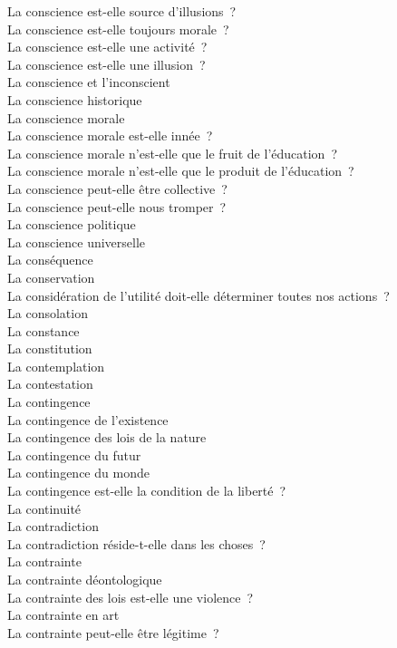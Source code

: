 \documentclass[a4paper,12pt]{article}
\begin{document}
La conscience est-elle source d'illusions ? \\
La conscience est-elle toujours morale ? \\
La conscience est-elle une activité ? \\
La conscience est-elle une illusion ? \\
La conscience et l'inconscient \\
La conscience historique \\
La conscience morale \\
La conscience morale est-elle innée ? \\
La conscience morale n'est-elle que le fruit de l'éducation ? \\
La conscience morale n'est-elle que le produit de l'éducation ? \\
La conscience peut-elle être collective ? \\
La conscience peut-elle nous tromper ? \\
La conscience politique \\
La conscience universelle \\
La conséquence \\
La conservation \\
La considération de l'utilité doit-elle déterminer toutes nos actions ? \\
La consolation \\
La constance \\
La constitution \\
La contemplation \\
La contestation \\
La contingence \\
La contingence de l'existence \\
La contingence des lois de la nature \\
La contingence du futur \\
La contingence du monde \\
La contingence est-elle la condition de la liberté ? \\
La continuité \\
La contradiction \\
La contradiction réside-t-elle dans les choses ? \\
La contrainte \\
La contrainte déontologique \\
La contrainte des lois est-elle une violence ? \\
La contrainte en art \\
La contrainte peut-elle être légitime ? \\
\end{document}

